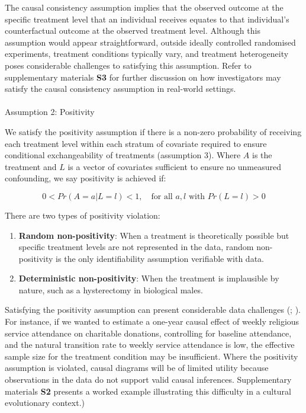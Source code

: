 \documentclass[
  single column]{article}
\makeatletter
\let\oldparagraph\paragraph
\renewcommand{\paragraph}{
    \@ifstar
      \xxxParagraphStar
      \xxxParagraphNoStar
  }
\newcommand{\xxxParagraphStar}[1]{\oldparagraph*{#1}\mbox{}}
\newcommand{\xxxParagraphNoStar}[1]{\oldparagraph{#1}\mbox{}}
\providecommand{\tightlist}{%
  \setlength{\itemsep}{0pt}\setlength{\parskip}{0pt}}\usepackage{longtable,booktabs,array}
\makeatother
\begin{document}
The causal consistency assumption implies that the observed outcome at
the specific treatment level that an individual receives equates to that
individual's counterfactual outcome at the observed treatment level.
Although this assumption would appear straightforward, outside ideally
controlled randomised experiments, treatment conditions typically vary,
and treatment heterogeneity poses considerable challenges to satisfying
this assumption. Refer to supplementary materials \textbf{S3} for
further discussion on how investigators may satisfy the causal
consistency assumption in real-world settings.

\paragraph{Assumption 2: Positivity}\label{assumption-2-positivity}

We satisfy the positivity assumption if there is a non-zero probability
of receiving each treatment level within each stratum of covariate
required to ensure conditional exchangeability of treatments (assumption
3). Where \(A\) is the treatment and \(L\) is a vector of covariates
sufficient to ensure no unmeasured confounding, we say positivity is
achieved if:

\[
0 < Pr(A = a | L = l) < 1, \quad \text{for all } a, l \text{ with } Pr(L = l) > 0
\]

There are two types of positivity violation:

\begin{enumerate}
\def\labelenumi{\arabic{enumi}.}
\tightlist
\item
  \textbf{Random non-positivity}: When a treatment is theoretically
  possible but specific treatment levels are not represented in the
  data, random non-positivity is the only identifiability assumption
  verifiable with data.
\item
  \textbf{Deterministic non-positivity}: When the treatment is
  implausible by nature, such as a hysterectomy in biological males.
\end{enumerate}

Satisfying the positivity assumption can present considerable data
challenges (;
). For instance, if
we wanted to estimate a one-year causal effect of weekly religious
service attendance on charitable donations, controlling for baseline
attendance, and the natural transition rate to weekly service attendance
is low, the effective sample size for the treatment condition may be
insufficient. Where the positivity assumption is violated, causal
diagrams will be of limited utility because observations in the data do
not support valid causal inferences. Supplementary materials \textbf{S2}
presents a worked example illustrating this difficulty in a cultural
evolutionary context.)
\end{document}
